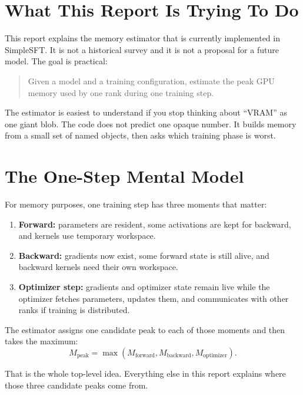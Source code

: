 \section{What This Report Is Trying To Do}
This report explains the memory estimator that is currently implemented in
SimpleSFT. It is not a historical survey and it is not a proposal for a future
model. The goal is practical:

\begin{quote}
Given a model and a training configuration, estimate the peak GPU memory used
by one rank during one training step.
\end{quote}

The estimator is easiest to understand if you stop thinking about ``VRAM'' as
one giant blob. The code does not predict one opaque number. It builds memory
from a small set of named objects, then asks which training phase is worst.

\section{The One-Step Mental Model}
For memory purposes, one training step has three moments that matter:
\begin{enumerate}[leftmargin=1.5em]
\item \textbf{Forward:} parameters are resident, some activations are kept for
backward, and kernels use temporary workspace.
\item \textbf{Backward:} gradients now exist, some forward state is still
alive, and backward kernels need their own workspace.
\item \textbf{Optimizer step:} gradients and optimizer state remain live while
the optimizer fetches parameters, updates them, and communicates with other
ranks if training is distributed.
\end{enumerate}

The estimator assigns one candidate peak to each of those moments and then
takes the maximum:
\[
M_{\mathrm{peak}} =
\max\!\left(
M_{\mathrm{forward}},
M_{\mathrm{backward}},
M_{\mathrm{optimizer}}
\right).
\]

That is the whole top-level idea. Everything else in this report explains where
those three candidate peaks come from.


